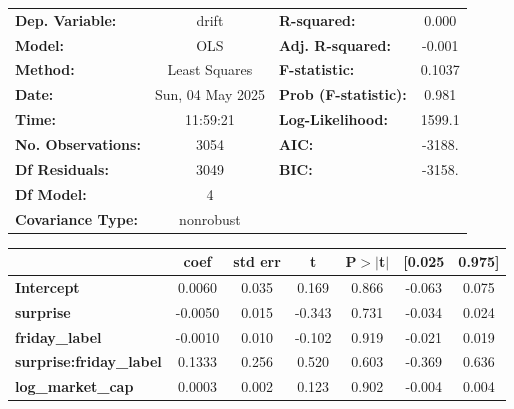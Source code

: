 \begin{center}
\begin{tabular}{lclc}
\toprule
\textbf{Dep. Variable:}         &      drift       & \textbf{  R-squared:         } &     0.000   \\
\textbf{Model:}                 &       OLS        & \textbf{  Adj. R-squared:    } &    -0.001   \\
\textbf{Method:}                &  Least Squares   & \textbf{  F-statistic:       } &    0.1037   \\
\textbf{Date:}                  & Sun, 04 May 2025 & \textbf{  Prob (F-statistic):} &    0.981    \\
\textbf{Time:}                  &     11:59:21     & \textbf{  Log-Likelihood:    } &    1599.1   \\
\textbf{No. Observations:}      &        3054      & \textbf{  AIC:               } &    -3188.   \\
\textbf{Df Residuals:}          &        3049      & \textbf{  BIC:               } &    -3158.   \\
\textbf{Df Model:}              &           4      & \textbf{                     } &             \\
\textbf{Covariance Type:}       &    nonrobust     & \textbf{                     } &             \\
\bottomrule
\end{tabular}
\begin{tabular}{lcccccc}
                                & \textbf{coef} & \textbf{std err} & \textbf{t} & \textbf{P$> |$t$|$} & \textbf{[0.025} & \textbf{0.975]}  \\
\midrule
\textbf{Intercept}              &       0.0060  &        0.035     &     0.169  &         0.866        &       -0.063    &        0.075     \\
\textbf{surprise}               &      -0.0050  &        0.015     &    -0.343  &         0.731        &       -0.034    &        0.024     \\
\textbf{friday\_label}          &      -0.0010  &        0.010     &    -0.102  &         0.919        &       -0.021    &        0.019     \\
\textbf{surprise:friday\_label} &       0.1333  &        0.256     &     0.520  &         0.603        &       -0.369    &        0.636     \\
\textbf{log\_market\_cap}       &       0.0003  &        0.002     &     0.123  &         0.902        &       -0.004    &        0.004     \\

\end{tabular}
\end{center}
